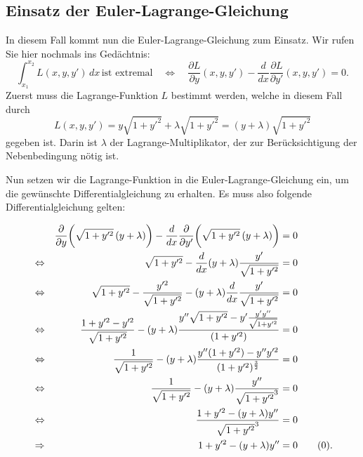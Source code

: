 \subsection{Einsatz der Euler-Lagrange-Gleichung
\label{kettenlinie:subsection:Einsatz der Euler-Lagrange-Gleichung}}
In diesem Fall kommt nun die Euler-Lagrange-Gleichung zum Einsatz.
Wir rufen Sie hier nochmals ins Gedächtnis:
\begin{equation}
	\int_{x_1}^{x_2} L(x, y, y') \, dx \, \text{ist extremal}
\quad\Leftrightarrow\quad
\frac{\partial L}{\partial y}(x, y, y') - \frac{d}{dx} \frac{\partial L}{\partial y'}(x, y, y') = 0.
\end{equation}
Zuerst muss die Lagrange-Funktion \(L\) bestimmt werden, welche in diesem Fall durch
\begin{equation}
	L(x, y, y')
	=
	y \sqrt{1+y'^2} + \lambda \sqrt{1+y'^2}
	=
	(y + \lambda) \sqrt{1+y'^2}
\end{equation}
gegeben ist.
Darin ist \(\lambda\) der Lagrange-Multiplikator, der zur Berücksichtigung der Nebenbedingung nötig ist.

Nun setzen wir die Lagrange-Funktion in die Euler-Lagrange-Gleichung ein, um die gewünschte Differentialgleichung zu erhalten. Es muss also folgende Differentialgleichung gelten:

\begin{align*}
	&                 &
	\frac{\partial}{\partial y} \biggl( \sqrt{1 + y'^2} \, (y + \lambda) \biggr) - \frac{d}{dx} \frac{\partial}{\partial y'} \biggl( \sqrt{1 + y'^2} \, (y + \lambda) \biggr) 
	&=
	0
	\\
	& \Leftrightarrow &
	\sqrt{1 + y'^2} - \frac{d}{dx} (y + \lambda) \dfrac{y'}{\sqrt{1 + y'^2}}
	&=
	0
	\\
	& \Leftrightarrow &
	\sqrt{1 + y'^2} - \frac{y'^2}{\sqrt{1 + y'^2}} - (y + \lambda) \frac{d}{dx} \frac{y'}{\sqrt{1 + y'^2}}
	&=
	0
	\\
	& \Leftrightarrow &
	\frac{1 + y'^2 - y'^2}{\sqrt{1 + y'^2}} - (y + \lambda) \frac{y'' \sqrt{1 + y'^2} - y' \frac{y' y''}{\sqrt{1 + y'^2}}}{(1 + y'^2)} 
	&=
	0
	\\
	& \Leftrightarrow &
	\frac{1}{\sqrt{1 + y'^2}} - (y + \lambda) \frac{y'' (1 + y'^2) - y''y'^2}{(1 + y'^2)^ \frac{3}{2}} 
	&=
	0
	\\
	& \Leftrightarrow &
	\frac{1}{\sqrt{1 + y'^2}} - (y + \lambda) \frac{y''}{\sqrt{1 + y'^2}^3} 
	&=
	0
	\\
	& \Leftrightarrow &
	\frac{1 + y'^2 - (y + \lambda) y''} {\sqrt{1 + y'^2}^3}
	&=
	0
	\\
	& \Rightarrow &
	1 + y'^2 - (y + \lambda) y''
	&=
	0 \label{kettenlinie:equation_1} \tag{\theequation} \stepcounter{equation}.
\end{align*}

